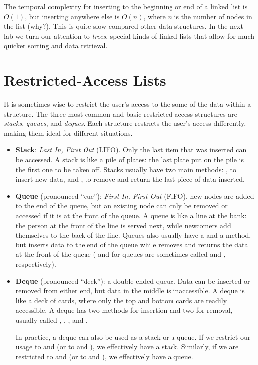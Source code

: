 \begin{info} %
The temporal complexity for inserting to the beginning or end of a linked list is $O(1)$, but inserting anywhere else is $O(n)$, where $n$ is the number of nodes in the list (why?).
This is quite slow compared other data structures.
In the next lab we turn our attention to \emph{trees}, special kinds of linked lists that allow for much quicker sorting and data retrieval.
\end{info}

\section*{Restricted-Access Lists} %

It is sometimes wise to restrict the user's access to the some of the data within a structure.
The three most common and basic restricted-access structures are \emph{stacks}, \emph{queues}, and \emph{deques}.
Each structure restricts the user's access differently, making them ideal for different situations.

\begin{itemize}
\item \textbf{Stack}: \emph{Last In, First Out} (LIFO).
Only the last item that was inserted can be accessed.
A stack is like a pile of plates: the last plate put on the pile is the first one to be taken off.
Stacks usually have two main methods: , to insert new data, and , to remove and return the last piece of data inserted.

\item \textbf{Queue} (pronounced ``cue''): \emph{First In, First Out} (FIFO).
new nodes are added to the end of the queue, but an existing node can only be removed or accessed if it is at the front of the queue.
A queue is like a line at the bank: the person at the front of the line is served next, while newcomers add themselves to the back of the line.
Queues also usually have a  and a  method, but  inserts data to the end of the queue while  removes and returns the data at the front of the queue ( and  for queues are sometimes called  and , respectively).

\item \textbf{Deque} (pronounced ``deck''): a double-ended queue.
Data can be inserted or removed from either end, but data in the middle is inaccessible.
A deque is like a deck of cards, where only the top and bottom cards are readily accessible.
A deque has two methods for insertion and two for removal, usually called , , , and .

In practice, a deque can also be used as a stack or a queue.
If we restrict our usage to  and  (or to  and ), we effectively have a stack.
Similarly, if we are restricted to  and  (or to  and ), we effectively have a queue.
\end{itemize}

